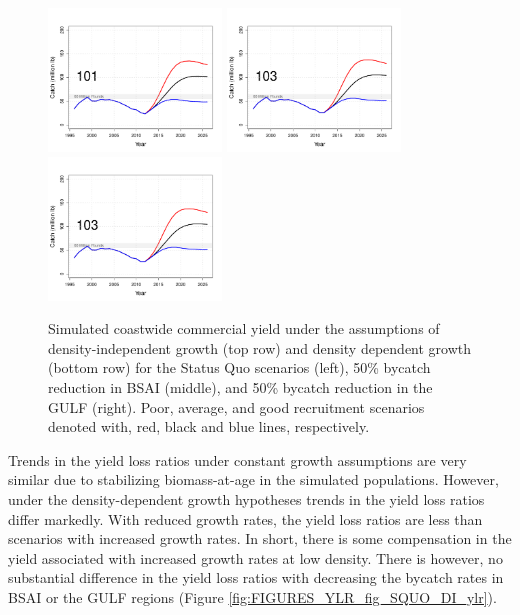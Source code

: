 \begin{figure}[htbp]
		\includegraphics[height=1.5in]{../FIGURES/fig_SQUO_DD_YBio.pdf}
		\includegraphics[height=1.5in]{../FIGURES/fig_BSAI_DD_YBio.pdf}
		\includegraphics[height=1.5in]{../FIGURES/fig_GULF_DD_YBio.pdf}
	\caption{Simulated coastwide commercial yield under the assumptions of density-independent growth (top row) and density dependent growth (bottom row) for the Status Quo scenarios (left), 50\% bycatch reduction in BSAI (middle), and 50\% bycatch reduction in the GULF (right).  Poor, average, and good recruitment scenarios denoted with, red, black and blue lines, respectively.}
	\label{fig:FIGURES_fig_SQUO_DI_YBio}
\end{figure}

Trends in the yield loss ratios under constant growth assumptions are very similar due to stabilizing biomass-at-age in the simulated populations.  However, under the density-dependent growth hypotheses trends in the yield loss ratios differ markedly.  With reduced growth rates, the yield loss ratios are less than scenarios with increased growth rates.  In short, there is some compensation in the yield  associated with increased growth rates at low density.  There is however, no substantial difference in the yield loss ratios with decreasing the bycatch rates in BSAI or the GULF regions (Figure \ref{fig:FIGURES_YLR_fig_SQUO_DI_ylr}).


